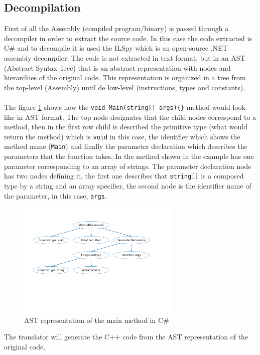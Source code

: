 \subsection{Decompilation}\label{SS:AN-Process-Decom}
First of all the Assembly (compiled program/binary) is passed through a decompiler in order to extract the source code. In this case the code extracted is C\# and to decompile it is used the ILSpy which is an open-source .NET assembly decompiler. The code is not extracted in text format, but in an AST (Abstract Syntax Tree) that is an abstract representation with nodes and hierarchies of the original code. This representation is organized in a tree from the top-level (Assembly) until de low-level (instructions, types and constants).
\\
\\
The figure \ref{fig:AN-AST} shows how the \verb!void Main(string[] args){}! method would look like in AST format. The top node designates that the child nodes correspond to a method, then in the first row child is described the primitive type (what would return the method) which is \verb!void! in this case, the identifier which shows the method name (\verb!Main!) and finally the parameter declaration which describes the parameters that the function takes. In the method shown in the example has one parameter corresponding to an array of strings. The parameter declaration node has two nodes defining it, the first one describes that \verb!string[]! is a composed type by a string and an array specifier, the second node is the identifier name of the parameter, in this case, \verb!args!.
\begin{figure}[H]\begin{center}
 \centering
  \captionsetup{justification=centering}
  \includegraphics[width=0.7\textwidth]{pictures/alternative/csharp_main_ast}
  \caption{AST representation of the main method in C\#\label{fig:AN-AST}}
\end{center}\end{figure}
The translator will generate the C++ code from the AST representation of the original code.
